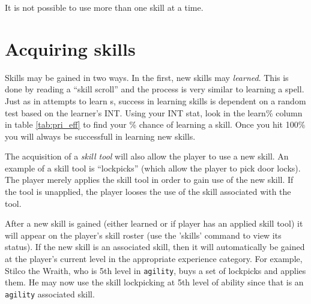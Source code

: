 It is not possible to use more than one skill at a time.
 
\section{Acquiring skills}

Skills may be gained in two ways. In the first, new skills may {\em learned}.
This is done by reading a ``skill scroll'' and the process is very similar
to learning a spell. Just as in attempts to learn \incantation s, success in 
learning skills is dependent on a random test based on the learner's INT.
Using your INT stat, look in the learn\% column in table \ref{tab:pri_eff} 
to find your \% chance of learning a skill. Once you hit 100\% you will 
always be successfull in learning new skills. 

The acquisition of a {\em skill tool} will also allow the player to use
a new skill. An example of a skill tool is ``lockpicks''
(which allow the
player to pick door locks). The player merely applies the skill
tool in order to gain use of the new skill. If the tool is unapplied,
the player looses the use of the skill associated with the tool.

After a new skill is gained (either learned or if player has an applied
skill tool) it will appear on the player's skill roster (use the
'skills' command to view its status). If the new skill is an associated
skill, then it will automatically be gained at the player's current level 
in the appropriate experience category. For example, Stilco the Wraith, 
who is 5th level in {\tt agility}, buys a set of lockpicks and applies them.
He may now use the skill lockpicking at 5th level of ability since that 
is an {\tt agility} associated skill.

